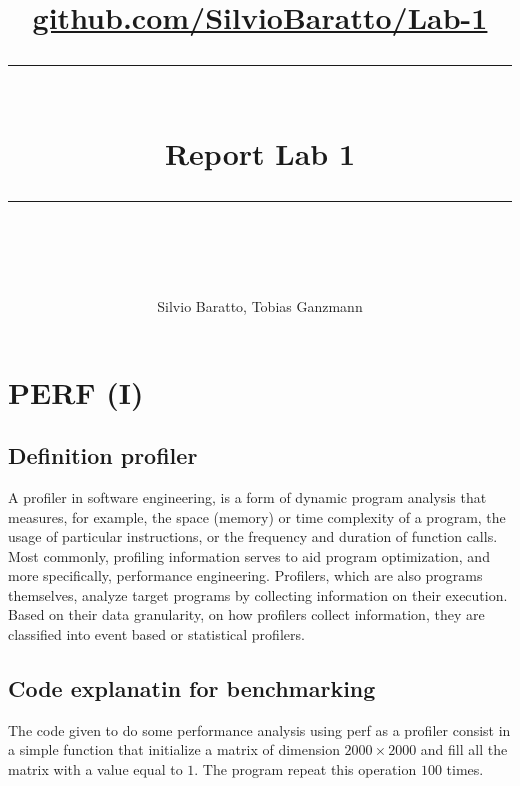 \documentclass[11pt,a4paper]{article}
\begin{document}
\newcommand{\horrule}[1]{\rule{\linewidth}{#1}}
\lstset{language=Java} 
\lstset{basicstyle=\footnotesize\ttfamily}
\author{Silvio Baratto, Tobias Ganzmann}
\title{
\normalfont \normalsize 
\href{https://github.com/SilvioBaratto/Numerical-and-Data-Intensive-Computing}{github.com/SilvioBaratto/Lab-1} \\ [25pt] %
\horrule{0.5pt} \\[0.4cm] %
\huge Report Lab 1\\ %
\horrule{2pt} \\[0.5cm] %
}
\maketitle
\tableofcontents
\newpage
\section{PERF (I)}
\subsection{Definition profiler}
A profiler in software engineering, is a form of dynamic program analysis that measures, for example, the space (memory) or time complexity of a program, the usage of particular instructions, or the frequency and duration of function calls. Most commonly, profiling information serves to aid program optimization, and more specifically, performance engineering. Profilers, which are also programs themselves, analyze target programs by collecting information on their execution. Based on their data granularity, on how profilers collect information, they are classified into event based or statistical profilers.\\
\subsection{Code explanatin for benchmarking}
The code given to do some performance analysis using perf as a profiler consist in a simple function that initialize a matrix of dimension $2000 \times 2000$ and fill all the matrix with a value equal to $1$. The program repeat this operation $100$ times. 
\end{document}
